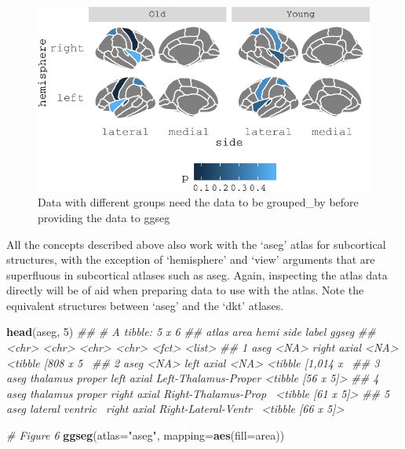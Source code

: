 \documentclass[fleqn,10pt]{wlpeerj} %
\newenvironment{Shaded}{\begin{snugshade}}{\end{snugshade}}
\newcommand{\CommentTok}[1]{\textcolor[rgb]{0.56,0.35,0.01}{\textit{#1}}}
\newcommand{\DataTypeTok}[1]{\textcolor[rgb]{0.13,0.29,0.53}{#1}}
\newcommand{\DecValTok}[1]{\textcolor[rgb]{0.00,0.00,0.81}{#1}}
\newcommand{\KeywordTok}[1]{\textcolor[rgb]{0.13,0.29,0.53}{\textbf{#1}}}
\newcommand{\NormalTok}[1]{#1}
\newcommand{\StringTok}[1]{\textcolor[rgb]{0.31,0.60,0.02}{#1}}
\begin{document}
\begin{figure}
\centering
\includegraphics{draft_2_files/figure-latex/datasupp3-1.pdf}
\caption{\label{fig:datasupp3}Data with different groups need the data to be grouped\_by before providing the data to ggseg}
\end{figure}

All the concepts described above also work with the `aseg' atlas for subcortical structures, with the exception of `hemisphere' and `view' arguments that are superfluous in subcortical atlases such as aseg.
Again, inspecting the atlas data directly will be of aid when preparing data to use with the atlas.
Note the equivalent structures between `aseg' and the `dkt' atlases.

\small

\begin{Shaded}
\begin{Highlighting}[]
\KeywordTok{head}\NormalTok{(aseg, }\DecValTok{5}\NormalTok{)}
\CommentTok{## # A tibble: 5 x 6}
\CommentTok{##   atlas area             hemi  side  label                ggseg            }
\CommentTok{##   <chr> <chr>            <chr> <chr> <fct>                <list>           }
\CommentTok{## 1 aseg  <NA>             right axial <NA>                 <tibble [808 x 5~}
\CommentTok{## 2 aseg  <NA>             left  axial <NA>                 <tibble [1,014 x~}
\CommentTok{## 3 aseg  thalamus proper  left  axial Left-Thalamus-Proper <tibble [56 x 5]>}
\CommentTok{## 4 aseg  thalamus proper  right axial Right-Thalamus-Prop~ <tibble [61 x 5]>}
\CommentTok{## 5 aseg  lateral ventric~ right axial Right-Lateral-Ventr~ <tibble [66 x 5]>}
\end{Highlighting}
\end{Shaded}

\normalsize

\begin{Shaded}
\begin{Highlighting}[]
\CommentTok{# Figure 6}
\KeywordTok{ggseg}\NormalTok{(}\DataTypeTok{atlas=}\StringTok{"aseg"}\NormalTok{, }\DataTypeTok{mapping=}\KeywordTok{aes}\NormalTok{(}\DataTypeTok{fill=}\NormalTok{area))}
\end{Highlighting}
\end{Shaded}
\end{document}

